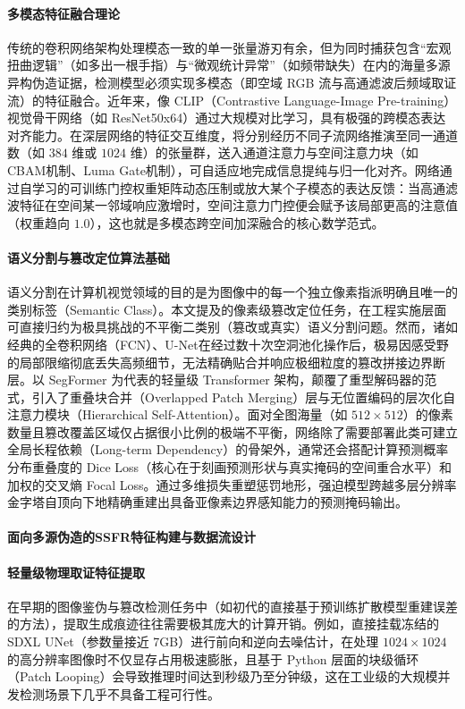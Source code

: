 \documentclass[10pt,a4paper,twocolumn]{ctexart}
\begin{document}
\paragraph{多模态特征融合理论}
传统的卷积网络架构处理模态一致的单一张量游刃有余，但为同时捕获包含“宏观扭曲逻辑”（如多出一根手指）与“微观统计异常”（如频带缺失）在内的海量多源异构伪造证据，检测模型必须实现多模态（即空域 RGB 流与高通滤波后频域取证流）的特征融合。近年来，像 CLIP（Contrastive Language-Image Pre-training）视觉骨干网络（如 ResNet50x64）通过大规模对比学习，具有极强的跨模态表达对齐能力。在深层网络的特征交互维度，将分别经历不同子流网络推演至同一通道数（如 $384$ 维或 $1024$ 维）的张量群，送入通道注意力与空间注意力块（如 CBAM机制、Luma Gate机制），可自适应地完成信息提纯与归一化对齐。网络通过自学习的可训练门控权重矩阵动态压制或放大某个子模态的表达反馈：当高通滤波特征在空间某一邻域响应激增时，空间注意力门控便会赋予该局部更高的注意值（权重趋向 $1.0$），这也就是多模态跨空间加深融合的核心数学范式。

\paragraph{语义分割与篡改定位算法基础}
语义分割在计算机视觉领域的目的是为图像中的每一个独立像素指派明确且唯一的类别标签（Semantic Class）。本文提及的像素级篡改定位任务，在工程实施层面可直接归约为极具挑战的不平衡二类别（篡改或真实）语义分割问题。然而，诸如经典的全卷积网络（FCN）、U-Net在经过数十次空洞池化操作后，极易因感受野的局部限缩彻底丢失高频细节，无法精确贴合并响应极细粒度的篡改拼接边界断层。以 SegFormer 为代表的轻量级 Transformer 架构，颠覆了重型解码器的范式，引入了重叠块合并（Overlapped Patch Merging）层与无位置编码的层次化自注意力模块（Hierarchical Self-Attention）。面对全图海量（如 $512 \times 512$）的像素数量且篡改覆盖区域仅占据很小比例的极端不平衡，网络除了需要部署此类可建立全局长程依赖（Long-term Dependency）的骨架外，通常还会搭配计算预测概率分布重叠度的 Dice Loss（核心在于刻画预测形状与真实掩码的空间重合水平）和加权的交叉熵 Focal Loss。通过多维损失重塑惩罚地形，强迫模型跨越多层分辨率金字塔自顶向下地精确重建出具备亚像素边界感知能力的预测掩码输出。

\paragraph{面向多源伪造的SSFR特征构建与数据流设计}

\paragraph{轻量级物理取证特征提取}
在早期的图像鉴伪与篡改检测任务中（如初代的直接基于预训练扩散模型重建误差的方法），提取生成痕迹往往需要极其庞大的计算开销。例如，直接挂载冻结的 SDXL UNet（参数量接近 7GB）进行前向和逆向去噪估计，在处理 $1024 \times 1024$ 的高分辨率图像时不仅显存占用极速膨胀，且基于 Python 层面的块级循环（Patch Looping）会导致推理时间达到秒级乃至分钟级，这在工业级的大规模并发检测场景下几乎不具备工程可行性。
\end{document}
